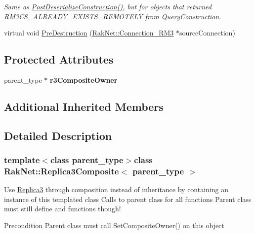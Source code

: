 \begin{DoxyCompactItemize}
\begin{DoxyCompactList}\small\item\em Same as \hyperlink{class_rak_net_1_1_replica3_composite_ac8258f928d6922f928c5d842c62c8094}{Post\-Deserialize\-Construction()}, but for objects that returned R\-M3\-C\-S\-\_\-\-A\-L\-R\-E\-A\-D\-Y\-\_\-\-E\-X\-I\-S\-T\-S\-\_\-\-R\-E\-M\-O\-T\-E\-L\-Y from Query\-Construction. \end{DoxyCompactList}\item 
virtual void \hyperlink{class_rak_net_1_1_replica3_composite_a5756a6c31fde002484a031199c32f053}{Pre\-Destruction} (\hyperlink{class_rak_net_1_1_connection___r_m3}{Rak\-Net\-::\-Connection\-\_\-\-R\-M3} $\ast$source\-Connection)
\end{DoxyCompactItemize}
\subsection*{Protected Attributes}
\begin{DoxyCompactItemize}
\item 
\hypertarget{class_rak_net_1_1_replica3_composite_a1e5f9de89e61db026b48329c2df0db39}{parent\-\_\-type $\ast$ {\bfseries r3\-Composite\-Owner}}\label{class_rak_net_1_1_replica3_composite_a1e5f9de89e61db026b48329c2df0db39}

\end{DoxyCompactItemize}
\subsection*{Additional Inherited Members}


\subsection{Detailed Description}
\subsubsection*{template$<$class parent\-\_\-type$>$class Rak\-Net\-::\-Replica3\-Composite$<$ parent\-\_\-type $>$}

Use \hyperlink{class_rak_net_1_1_replica3}{Replica3} through composition instead of inheritance by containing an instance of this templated class Calls to parent class for all functions Parent class must still define and functions though! 

\begin{DoxyPrecond}{Precondition}
Parent class must call Set\-Composite\-Owner() on this object 
\end{DoxyPrecond}


